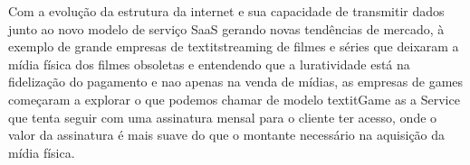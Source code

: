 \begin{justify}
    Com a evolução da estrutura da internet e sua capacidade de transmitir dados junto ao novo
    modelo de serviço SaaS gerando novas tendências de mercado, à exemplo de grande empresas de
    textit{streaming} de filmes e séries que deixaram a mídia física dos filmes obsoletas e
    entendendo que a luratividade está na fidelização do pagamento e nao apenas na venda de mídias,
    as empresas de games começaram a explorar o que podemos chamar de modelo textit{Game as a
    Service} que tenta seguir com uma assinatura mensal para o cliente ter acesso, onde o valor da
    assinatura é mais suave do que o montante necessário na aquisição da mídia física.

\end{justify}